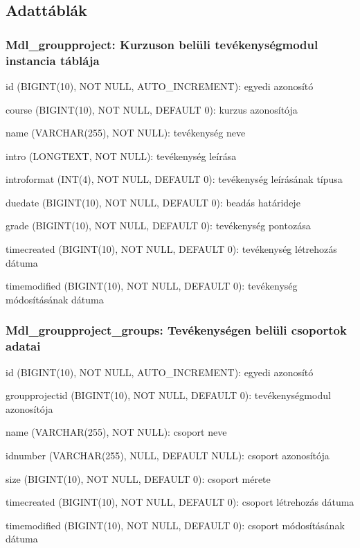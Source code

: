 \subsection{Adattáblák}

\subsubsection{\textbf{Mdl\_groupproject: Kurzuson belüli tevékenységmodul instancia táblája}}
\begin{compactitem}
	\item id (BIGINT(10), NOT NULL, AUTO\_INCREMENT): egyedi azonosító
    \item course (BIGINT(10), NOT NULL, DEFAULT 0): kurzus azonosítója
    \item name (VARCHAR(255), NOT NULL): tevékenység neve
    \item intro (LONGTEXT, NOT NULL): tevékenység leírása
    \item introformat (INT(4), NOT NULL, DEFAULT 0): tevékenység leírásának típusa
     \item duedate (BIGINT(10), NOT NULL, DEFAULT 0): beadás határideje
    \item grade (BIGINT(10), NOT NULL, DEFAULT 0): tevékenység pontozása
    \item timecreated (BIGINT(10), NOT NULL, DEFAULT 0): tevékenység létrehozás dátuma
    \item timemodified (BIGINT(10), NOT NULL, DEFAULT 0): tevékenység módosításának dátuma
 \end{compactitem}

\subsubsection{\textbf{Mdl\_groupproject\_groups: Tevékenységen belüli csoportok adatai}}
\begin{compactitem}
	\item id (BIGINT(10), NOT NULL, AUTO\_INCREMENT): egyedi azonosító
    \item groupprojectid (BIGINT(10), NOT NULL, DEFAULT 0): tevékenységmodul azonosítója
    \item name (VARCHAR(255), NOT NULL): csoport neve
    \item idnumber (VARCHAR(255),  NULL, DEFAULT NULL): csoport azonosítója
    \item size (BIGINT(10), NOT NULL, DEFAULT 0): csoport mérete
    \item timecreated (BIGINT(10), NOT NULL, DEFAULT 0): csoport létrehozás dátuma
    \item timemodified (BIGINT(10), NOT NULL, DEFAULT 0): csoport módosításának dátuma
 \end{compactitem} 

